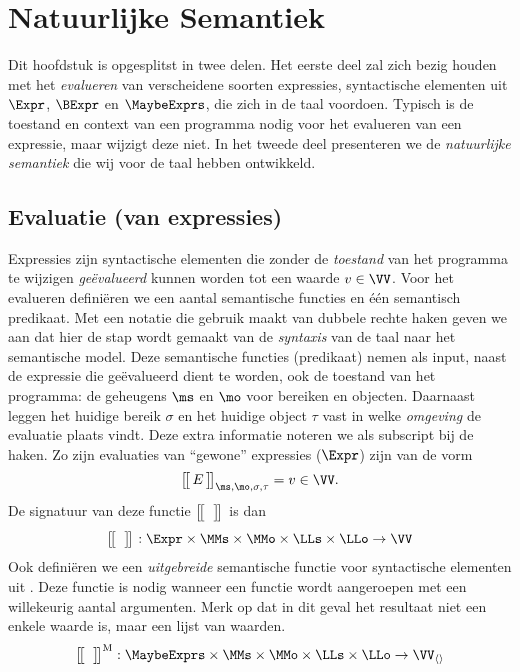 
\chapter{Natuurlijke Semantiek}

Dit hoofdstuk is opgesplitst in twee delen. Het eerste deel zal zich bezig houden met het \emph{evalueren} van verscheidene soorten expressies, syntactische elementen uit $\Expr$, $\BExpr$ en $\MaybeExprs$, die zich in de taal voordoen. Typisch is de toestand en context van een programma nodig voor het evalueren van een expressie, maar wijzigt deze niet. In het tweede deel presenteren we de \emph{natuurlijke semantiek} die wij voor de taal hebben ontwikkeld.

\section{Evaluatie (van expressies)}

Expressies zijn syntactische elementen die zonder de \emph{toestand} van het programma te wijzigen \emph{geëvalueerd} kunnen worden tot een waarde $v \in \VV$. 
Voor het evalueren definiëren we een aantal semantische functies en één semantisch predikaat. Met een notatie die gebruik maakt van dubbele rechte haken geven we aan dat hier de stap wordt gemaakt van de \emph{syntaxis} van de taal naar het semantische model. Deze semantische functies (predikaat) nemen als input, naast de expressie die geëvalueerd dient te worden, ook de toestand van het programma: de geheugens $\ms$ en $\mo$ voor bereiken en objecten. Daarnaast leggen het huidige bereik $\sigma$ en het huidige object $\tau$ vast in welke \emph{omgeving} de evaluatie plaats vindt. Deze extra informatie noteren we als subscript bij de haken. Zo zijn evaluaties van ``gewone'' expressies ($\Expr$) zijn van de vorm
%
\begin{equation*}
  \Express{E}{\ms,\mo,\sigma,\tau} = v \in \VV.
\end{equation*}
%
De signatuur van deze functie $\big[\!\big[\,\;\,\big]\!\big]^\text{}_{}$ is dan
%
\begin{equation*}
  \Express{\;}{} : \Expr \times \MMs \times \MMo \times \LLs \times \LLo \to \VV \\
\end{equation*}
%
Ook definiëren we een \emph{uitgebreide} semantische functie voor syntactische elementen uit \MaybeExprs. Deze functie is nodig wanneer een functie wordt aangeroepen met een willekeurig aantal argumenten. Merk op dat in dit geval het resultaat niet een enkele waarde is, maar een lijst van waarden.
%
\begin{equation*}
  \Express[M]{\;}{} : \MaybeExprs \times \MMs \times \MMo \times \LLs \times \LLo \to \VV_{\langle\rangle}
\end{equation*}

